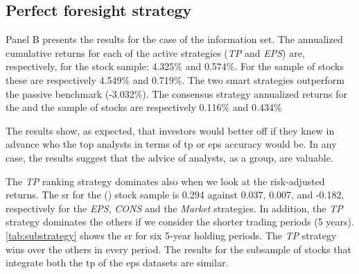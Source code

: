 \documentclass[a4paper,twoside,12pt,openright,notitlepage]{report}\usepackage[]{graphicx}\usepackage[]{color}
\begin{document}
\subsection{Perfect foresight strategy}
\label{ch1-sec:perfect}
Panel B presents the results for the case of the \tr{} information set. The annualized cumulative returns for each of the active strategies (\textit{TP} and \textit{EPS}) are, respectively, for the \all{} stock sample: 4.325\% and  0.574\%. For the \same{} sample of stocks these are respectively 4.549\% and 0.719\%. The two smart strategies outperform the passive benchmark (-3.032\%).  The consensus strategy annualized returns for the \all{} and the \same{} sample of stocks are respectively   0.116\% and  0.434\%


The results show, as expected, that  investors would better off if they knew in advance who the top analysts in terms of \gls{tp} or \gls{eps} accuracy would be. In any case, the results suggest that the advice of analysts, as a group, are valuable.


The \textit{TP} ranking strategy dominates also when we look at the risk-adjusted returns. The \gls{sr} for the \all{} (\same{}) stock sample is 0.294 against 0.037, 0.007, and -0.182, respectively for  the \textit{EPS}, \textit{CONS} and the \textit{Market} strategies. In addition, the \textit{TP} strategy dominates  the others if we consider the shorter trading periods (5 years). \ref{tab:substrategy} shows the \gls{sr} for six 5-year holding periods. The \textit{TP} strategy wins over the others in every period. The results for the subsample of stocks that integrate both the \gls{tp} of the \gls{eps} datasets are similar.
\end{document}
